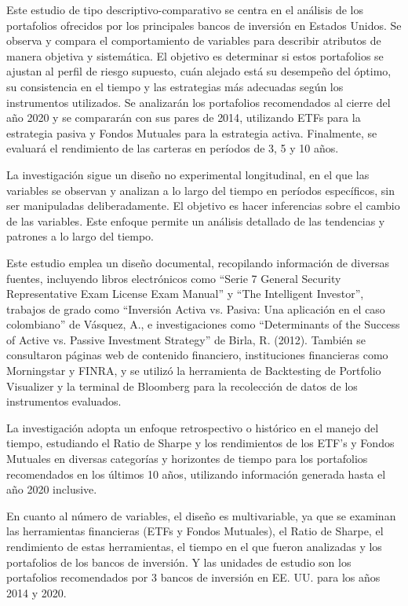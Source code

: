 \documentclass[a4paper,fleqn]{cas-sc}
\begin{document}
Este estudio de tipo descriptivo-comparativo se centra en el análisis de los portafolios ofrecidos por los principales bancos de inversión en Estados Unidos. Se observa y compara el comportamiento de variables para describir atributos de manera objetiva y sistemática. El objetivo es determinar si estos portafolios se ajustan al perfil de riesgo supuesto, cuán alejado está su desempeño del óptimo, su consistencia en el tiempo y las estrategias más adecuadas según los instrumentos utilizados. Se analizarán los portafolios recomendados al cierre del año {\color{red}2020} y se compararán con sus pares de {\color{red}2014}, utilizando ETFs para la estrategia pasiva y Fondos Mutuales para la estrategia activa. Finalmente, se evaluará el rendimiento de las carteras en {\color{red}períodos de 3, 5 y 10 años.}

La investigación sigue un diseño no experimental longitudinal, en el que las variables se observan y analizan a lo largo del tiempo en períodos específicos, sin ser manipuladas deliberadamente. El objetivo es hacer inferencias sobre el cambio de las variables. Este enfoque permite un análisis detallado de las tendencias y patrones a lo largo del tiempo.

{\color{red}Este estudio emplea un diseño documental, recopilando información de diversas fuentes, incluyendo libros electrónicos como “Serie 7 General Security Representative Exam License Exam Manual” y “The Intelligent Investor”, trabajos de grado como “Inversión Activa vs. Pasiva: Una aplicación en el caso colombiano” de Vásquez, A., e investigaciones como “Determinants of the Success of Active vs. Passive Investment Strategy” de Birla, R. (2012). También se consultaron páginas web de contenido financiero, instituciones financieras como Morningstar y FINRA, y se utilizó la herramienta de Backtesting de Portfolio Visualizer y la terminal de Bloomberg para la recolección de datos de los instrumentos evaluados.}

La investigación adopta un enfoque retrospectivo o histórico en el manejo del tiempo, estudiando el Ratio de Sharpe y los rendimientos de los ETF’s y Fondos Mutuales en diversas categorías y horizontes de tiempo para los portafolios recomendados en los últimos 10 años, utilizando información generada hasta el {\color{red}año 2020 inclusive.}

En cuanto al número de variables, el diseño es multivariable, ya que se examinan las herramientas financieras (ETFs y Fondos Mutuales), el Ratio de Sharpe, el rendimiento de estas herramientas, el tiempo en el que fueron analizadas y los portafolios de los bancos de inversión. Y las unidades de estudio son los portafolios recomendados por 3 bancos de inversión en EE. UU. para {\color{red}los años 2014 y 2020.}
\end{document}
